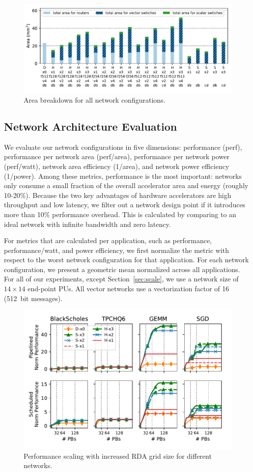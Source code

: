 \begin{figure}
\centering
\includegraphics[width=1\columnwidth]{network/figs/area.pdf}
  \caption{Area breakdown for all network configurations.}\label{fig:area}
\end{figure}

\subsection{Network Architecture Evaluation} \label{sec:net_dse}

We evaluate our network configurations in five dimensions: performance (perf), performance per network area (perf/area), performance per network
power (perf/watt), network area efficiency (1/area), and network power efficiency (1/power). 
Among these metrics, performance is the most important: networks only consume a small fraction of the overall accelerator area and energy (roughly 10-20\%). 
Because the two key advantages of hardware accelerators are high throughput and low latency, 
we filter out a network design point if it introduces
more than 10\% performance overhead.
This is calculated by comparing to an ideal network with infinite bandwidth and zero latency.

For metrics that are calculated per application, such as performance, performance/watt, and power efficiency, we first normalize the metric with respect to the 
worst network configuration for that application. 
For each network configuration, we present a geometric mean normalized across all applications. 
For all of our experiments, except Section~\ref{sec:scale}, we use a network
size of $14\times14$ end-point PUs. All vector networks use a vectorization factor of 16 (\SI{512}{bit} messages).

\begin{figure}
\centering
\includegraphics[width=0.8\columnwidth]{network/figs/scale.pdf}
\caption{Performance scaling with increased RDA grid size for different networks.}\label{fig:scale}
\end{figure}
